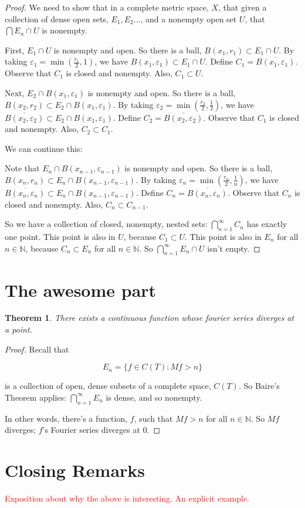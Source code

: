 \documentclass{amsart}
\newcommand{\vep}{\varepsilon}
\newcommand{\N}{\mathbb{N}}
\newtheorem{thm}{Theorem}[section]
\theoremstyle{definition}
\begin{document}
\begin{proof}
We need to show that in a complete metric space, $X$, that given a collection of dense open sets, $E_1, E_2 \ldots$, and a nonempty open set $U$, that $\bigcap E_n \cap U$ is nonempty.

First, $E_1 \cap U$ is nonempty and open.
So there is a ball, $B(x_1,r_1) \subset E_1 \cap U$.
By taking $\vep_1 = \min(\frac{r_1}{2},1)$, we have $\overline{B(x_1,\vep_1)} \subset E_1 \cap U$.
Define $C_1 = \overline{B(x_1,\vep_1)}$.
Observe that $C_1$ is closed and nonempty. Also, $C_1 \subset U$.

Next, $E_2 \cap B(x_1,\vep_1)$ is nonempty and open.
So there is a ball, $B(x_2,r_2) \subset E_2 \cap B(x_1,\vep_1)$.
By taking $\vep_2 = \min(\frac{r_2}{2},\frac{1}{2})$, we have $\overline{B(x_2,\vep_2)} \subset E_2 \cap B(x_1,\vep_1)$.
Define $C_2 = \overline{B(x_2,\vep_2)}$.
Observe that $C_1$ is closed and nonempty. Also, $C_2 \subset C_1$.

We can continue this:

Note that $E_n \cap B(x_{n-1},\vep_{n-1})$ is nonempty and open.
So there is a ball, $B(x_n,r_n) \subset E_n \cap B(x_{n-1},\vep_{n-1})$.
By taking $\vep_n = \min(\frac{r_n}{2},\frac{1}{n})$, we have $\overline{B(x_n,\vep_n)} \subset E_n \cap B(x_{n-1},\vep_{n-1})$.
Define $C_n = \overline{B(x_n,\vep_n)}$.
Observe that $C_n$ is closed and nonempty. Also, $C_n \subset C_{n-1}$.

So we have a collection of closed, nonempty, nested sets: $\bigcap\limits_{n=1}^\infty C_n$ has exactly one point.
This point is also in $U$, because $C_1 \subset U$.
This point is also in $E_n$ for all $n \in \N$, because $C_n \subset E_n$ for all $n \in \N$.
So $\bigcap\limits_{n=1}^\infty E_n \cap U$ isn't empty.

\end{proof}

\section{The awesome part}

\begin{thm}
There exists a continuous function whose fourier series diverges at a point.
\end{thm}

\begin{proof}

Recall that 

\begin{displaymath}
E_n = \{f \in C(T) : Mf > n\}
\end{displaymath}

is a collection of open, dense subsets of a complete space, $C(T)$. 
So Baire's Theorem applies: $\bigcap\limits_{n=1}^\infty E_n $ is dense, and so nonempty.

In other words, there's a function, $f$, such that $Mf >n$ for all $n \in \N$. 
So $Mf$ diverges; $f$'s Fourier series diverges at $0$. 

\end{proof}

\section{Closing Remarks}

\textcolor{red}{Exposition about why the above is interesting. An explicit example.}
\end{document}
